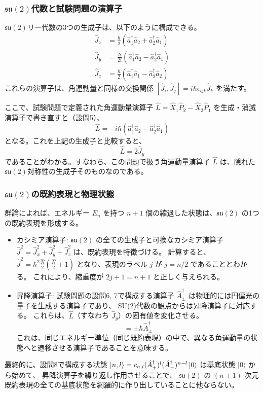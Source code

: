 \documentclass[../../sp_2022.tex]{subfiles}
\begin{document}
\subsubsection*{\(\mathfrak{su}(2)\)代数と試験問題の演算子}
\(\mathfrak{su}(2)\)リー代数の3つの生成子は、以下のように構成できる。
\begin{align}
    \hat{J}_x &= \frac{\hbar}{2}(\hat{a}_1^\dagger \hat{a}_2 + \hat{a}_2^\dagger \hat{a}_1) \\
    \hat{J}_y &= \frac{\hbar}{2i}(\hat{a}_1^\dagger \hat{a}_2 - \hat{a}_2^\dagger \hat{a}_1) \\
    \hat{J}_z &= \frac{\hbar}{2}(\hat{a}_1^\dagger \hat{a}_1 - \hat{a}_2^\dagger \hat{a}_2)
\end{align}
これらの演算子は、角運動量と同様の交換関係 $[\hat{J}_i, \hat{J}_j] = i\hbar\epsilon_{ijk}\hat{J}_k$ を満たす。

ここで、試験問題で定義された角運動量演算子 $\hat{L} = \hat{X}_1\hat{P}_2 - \hat{X}_2\hat{P}_1$ を生成・消滅演算子で書き直すと（設問5）、
\begin{equation}
    \hat{L} = -i\hbar(\hat{a}_1^\dagger \hat{a}_2 - \hat{a}_2^\dagger \hat{a}_1)
\end{equation}
となる。これを上記の生成子と比較すると、
\begin{equation}
    \hat{L} = 2\hat{J}_y
\end{equation}
であることがわかる。すなわち、{この問題で扱う角運動量演算子 $\hat{L}$ は、隠れた\(\mathfrak{su}(2)\)対称性の生成子そのもの}なのである。

\subsubsection*{\(\mathfrak{su}(2)\)の既約表現と物理状態}
群論によれば、エネルギー $E_n$ を持つ $n+1$ 個の縮退した状態は、\(\mathfrak{su}(2)\) の1つの{既約表現}を形成する。
\begin{itemize}
    \item {カシミア演算子}: \(\mathfrak{su}(2)\) の全ての生成子と可換なカシミア演算子 $\hat{J}^2 = \hat{J}_x^2 + \hat{J}_y^2 + \hat{J}_z^2$ は、既約表現を特徴づける。
    計算すると、$\hat{J}^2 = \hbar^2 \frac{\hat{N}}{2}(\frac{\hat{N}}{2}+1)$ となり、表現のラベル $j$ が $j=n/2$ であることとわかる。
    これにより、縮重度が $2j+1 = n+1$ と正しく与えられる。

    \item {昇降演算子}: 試験問題の設問6, 7で構成する演算子 $\hat{A}_\pm^\dagger$ は物理的には{円偏光の量子を生成する演算子}であり、
    SU(2)代数の観点からは{昇降演算子}に対応する。
    これらは、$\hat{L}$（すなわち $\hat{J}_y$）の固有値を変化させる。
    \begin{equation}
        [\hat{L}, \hat{A}_\pm^\dagger] = \pm\hbar \hat{A}_\pm^\dagger
    \end{equation}
    これは、同じエネルギー準位（同じ既約表現）の中で、異なる角運動量の状態へと遷移させる演算子であることを意味する。
\end{itemize}
最終的に、設問8で構成する状態 $\ket{n, l} = c_{n,l}(\hat{A}_+^\dagger)^{l}(\hat{A}_-^\dagger)^{n-l}\ket{0}$ は基底状態 $|0\rangle$ から始めて、
昇降演算子を繰り返し作用させることで、
\(\mathfrak{su}(2)\) の $(n+1)$ 次元既約表現の全ての基底状態を網羅的に作り出していることに他ならない。
\end{document}
